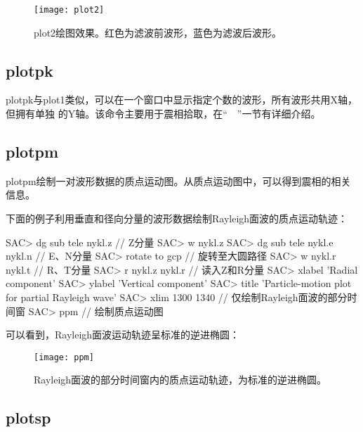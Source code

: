 \begin{figure}[H]
\centering
\texttt{[image: plot2]}
\caption[plot2绘图效果]{plot2绘图效果。红色为滤波前波形，蓝色为滤波后波形。}
\label{fig:plot2}
\end{figure}

\subsection{plotpk}
plotpk与plot1类似，可以在一个窗口中显示指定个数的波形，所有波形共用X轴，但拥有单独
的Y轴。该命令主要用于震相拾取，在``~~''一节有详细介绍。

\subsection{plotpm}
plotpm绘制一对波形数据的质点运动图。从质点运动图中，可以得到震相的相关信息。

下面的例子利用垂直和径向分量的波形数据绘制Rayleigh面波的质点运动轨迹：
\begin{SACCode}
SAC> dg sub tele nykl.z             // Z分量        
SAC> w nykl.z           
SAC> dg sub tele nykl.e nykl.n      // E、N分量
SAC> rotate to gcp                  // 旋转至大圆路径
SAC> w nykl.r nykl.t                // R、T分量
SAC> r nykl.z nykl.r                // 读入Z和R分量
SAC> xlabel 'Radial component'
SAC> ylabel 'Vertical component'
SAC> title 'Particle-motion plot for partial Rayleigh wave'
SAC> xlim 1300 1340                 // 仅绘制Rayleigh面波的部分时间窗
SAC> ppm                            // 绘制质点运动图
\end{SACCode}

可以看到，Rayleigh面波运动轨迹呈标准的逆进椭圆：
\begin{figure}[H]
\centering
\texttt{[image: ppm]}
\caption[质点运动图。]{Rayleigh面波的部分时间窗内的质点运动轨迹，为标准的逆进椭圆。}
\label{fig:ppm}
\end{figure}

\subsection{plotsp}
